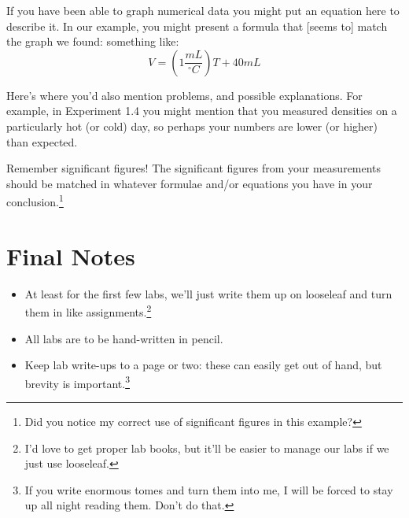 \documentclass[12pt, oneside]{article}   	%
\begin{document}
If you have been able to graph numerical data you might put an equation here to describe it. In our example, you might present a formula that [seems to] match the graph we found: something like:\\  $$ V = (1 \frac{mL}{^{\circ}C}) T + 40mL $$

Here's where you'd also mention problems, and possible explanations. For example, in Experiment 1.4 you might mention that you measured densities on a particularly hot (or cold) day, so perhaps your numbers are lower (or higher) than expected.

Remember significant figures! The significant figures from your measurements should be matched in whatever formulae and/or equations you have in your conclusion.\footnote{Did you notice my correct use of significant figures in this example?} 

\section{Final Notes}
\begin{itemize}
\item At least for the first few labs, we'll just write them up on looseleaf and turn them in like assignments.\footnote{I'd love to get proper lab books, but it'll be easier to manage our labs if we just use looseleaf.}
\item All labs are to be hand-written in pencil.
\item Keep lab write-ups to a page or two: these can easily get out of hand, but brevity is important.\footnote{If you write enormous tomes and turn them into me, I will be forced to stay up all night reading them. Don't do that.}
\end{itemize}
\end{document}

